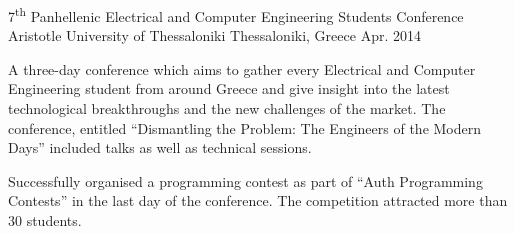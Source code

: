 \begin{cventries}
  \cventry
    {7\textsuperscript{th} Panhellenic Electrical and Computer Engineering Students Conference} %
    {Aristotle University of Thessaloniki} %
    {Thessaloniki, Greece} %
    {Apr. 2014} %
    {
      \begin{cvitems} %
        \item {A three-day conference which aims to gather every Electrical and Computer Engineering student from around Greece and give insight into the latest technological breakthroughs and the new challenges of the market. The conference, entitled ``Dismantling the Problem: The Engineers of the Modern Days'' included talks as well as technical sessions.}
        \item {Successfully organised a programming contest as part of ``Auth Programming Contests'' in the last day of the conference. The competition attracted more than 30 students.}
      \end{cvitems}
    }

\end{cventries}
